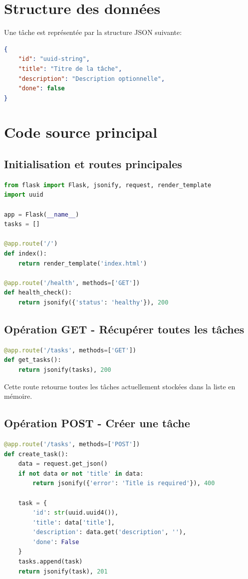 \documentclass[12pt,a4paper,twoside]{report}
\begin{document}
\section{Structure des données}

Une tâche est représentée par la structure JSON suivante:

\begin{lstlisting}[language=json]
{
    "id": "uuid-string",
    "title": "Titre de la tâche",
    "description": "Description optionnelle",
    "done": false
}
\end{lstlisting}

\section{Code source principal}

\subsection{Initialisation et routes principales}

\begin{lstlisting}[language=Python]
from flask import Flask, jsonify, request, render_template
import uuid

app = Flask(__name__)
tasks = []

@app.route('/')
def index():
    return render_template('index.html')

@app.route('/health', methods=['GET'])
def health_check():
    return jsonify({'status': 'healthy'}), 200
\end{lstlisting}

\subsection{Opération GET - Récupérer toutes les tâches}

\begin{lstlisting}[language=Python]
@app.route('/tasks', methods=['GET'])
def get_tasks():
    return jsonify(tasks), 200
\end{lstlisting}

Cette route retourne toutes les tâches actuellement stockées dans la liste en mémoire.

\subsection{Opération POST - Créer une tâche}

\begin{lstlisting}[language=Python]
@app.route('/tasks', methods=['POST'])
def create_task():
    data = request.get_json()
    if not data or not 'title' in data:
        return jsonify({'error': 'Title is required'}), 400
    
    task = {
        'id': str(uuid.uuid4()),
        'title': data['title'],
        'description': data.get('description', ''),
        'done': False
    }
    tasks.append(task)
    return jsonify(task), 201
\end{lstlisting}
\end{document}

